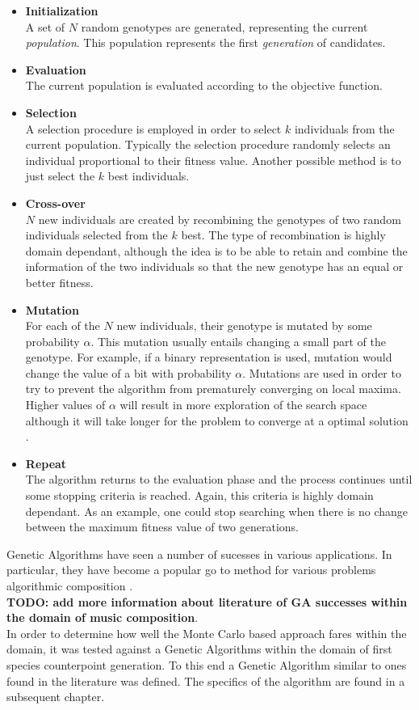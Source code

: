 \documentclass[master.tex]{subfiles}
\begin{document}
\begin{itemize}
\item \textbf{Initialization} \\  
\quad A set of $N$ random genotypes are generated, representing the current \emph{population}. This population represents the first \emph{generation} of candidates.  
\item \textbf{Evaluation} \\ The current population is evaluated according to the objective function. 
\item \textbf{Selection}\\ A selection procedure is employed in order to select $k$ individuals from the current population. Typically the selection procedure randomly selects an individual proportional to their fitness value. Another possible method is to just select the $k$ best individuals. 
\item \textbf{Cross-over} \\ $N$ new individuals are created by recombining the genotypes of two random individuals selected from the $k$ best. The type of recombination is highly domain dependant, although the idea is to be able to retain and combine the information of the two individuals so that the new genotype has an equal or better fitness. 
\item \textbf{Mutation} \\ For each of the $N$ new individuals, their genotype is mutated by some probability $\alpha$. This mutation usually entails changing a small part of the genotype. For example, if a binary representation is used, mutation would change the value of a bit with probability $\alpha$. Mutations are used in order to try to prevent the algorithm from prematurely converging on local maxima. Higher values of $\alpha$ will result in more exploration of the search space although it will take longer for the problem to converge at a optimal solution .  
\item \textbf{Repeat} \\ The algorithm returns to the evaluation phase and the process continues until some stopping criteria is reached. Again, this criteria is highly domain dependant. As an example, one could stop searching when there is no change between the maximum fitness value of two generations. 
\end{itemize} 
Genetic Algorithms have seen a number of sucesses in various applications. In particular, they have become a popular go to method for various problems algorithmic composition \citebay{}.   
\\
\textbf{TODO: add more information about literature of GA successes within the domain of music composition}. 
\\
In order to determine how well the Monte Carlo based approach fares within the domain, it was tested against a Genetic Algorithms within the domain of first species counterpoint generation. To this end a Genetic Algorithm similar to ones found in the literature was defined. The specifics of the algorithm are found in a subsequent chapter. 
\end{document}
